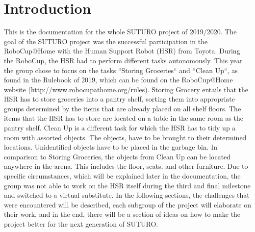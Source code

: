 \documentclass[main.tex]{subfiles}
\begin{document}
	\chapter{Introduction}
	
This is the documentation for the whole SUTURO project of 2019/2020. The goal of the SUTURO project was the successful participation in the RoboCup@Home with the Human Support Robot (HSR) from Toyota. During the RoboCup, the HSR had to perform different tasks autonomously.
This year the group chose to focus on the tasks “Storing Groceries“ and “Clean Up“, as found in the Rulebook of 2019, which can be found on the RoboCup@Home website (http://www.robocupathome.org/rules). 
Storing Grocery entails that the HSR has to store groceries into a pantry shelf, sorting them into appropriate groups determined by the items that are already placed on all shelf floors. The items that the HSR has to store are located on a table in the same room as the pantry shelf.
Clean Up is a different task for which the HSR has to tidy up a room with assorted objects. The objects, have to be brought to their determined locations. Unidentified objects have to be placed in the garbage bin. In comparison to Storing Groceries, the objects from Clean Up can be located anywhere in the arena. This includes the floor, seats, and other furniture.
Due to specific circumstances, which will be explained later in the documentation, the group was not able to work on the HSR itself during the third and final milestone and switched to a virtual substitute.
In the following sections, the challenges that were encountered will be described, each subgroup of the project will elaborate on their work, and in the end, there will be a section of ideas on how to make the project better for the next generation of SUTURO.
	
\end{document}
